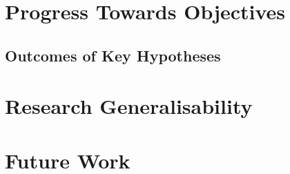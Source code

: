 

\section{Progress Towards Objectives}


\subsection{Outcomes of Key Hypotheses}



\section{Research Generalisability}



\section{Future Work} \label{sec:FutureWork}


